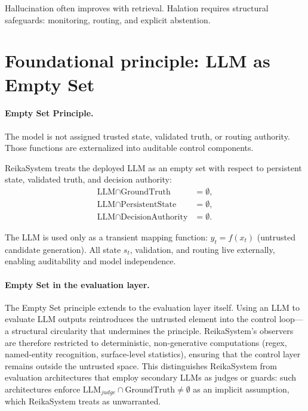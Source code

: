 \documentclass[11pt,a4paper]{article}
\begin{document}
Hallucination often improves with retrieval. Halation requires structural safeguards:
monitoring, routing, and explicit abstention.

\section{Foundational principle: LLM as Empty Set}

\paragraph{Empty Set Principle.}
The model is not assigned trusted state, validated truth, or routing authority. Those
functions are externalized into auditable control components.

ReikaSystem treats the deployed LLM as an empty set with respect to persistent state,
validated truth, and decision authority:
\begin{align}
\text{LLM} \cap \text{GroundTruth}      &= \emptyset, \label{eq:es1}\\
\text{LLM} \cap \text{PersistentState}  &= \emptyset, \label{eq:es2}\\
\text{LLM} \cap \text{DecisionAuthority}&= \emptyset. \label{eq:es3}
\end{align}

The LLM is used only as a transient mapping function:
$y_t = f(x_t)$ (untrusted candidate generation).
All state $s_t$, validation, and routing live externally, enabling auditability and
model independence.

\paragraph{Empty Set in the evaluation layer.}
The Empty Set principle extends to the evaluation layer itself.
Using an LLM to evaluate LLM outputs reintroduces the untrusted element into the
control loop---a structural circularity that undermines the principle.
ReikaSystem's observers are therefore restricted to deterministic, non-generative
computations (regex, named-entity recognition, surface-level statistics), ensuring
that the control layer remains outside the untrusted space.
This distinguishes ReikaSystem from evaluation architectures that employ secondary
LLMs as judges or guards: such architectures enforce
$\text{LLM}_{judge} \cap \text{GroundTruth} \neq \emptyset$
as an implicit assumption, which ReikaSystem treats as unwarranted.
\end{document}
